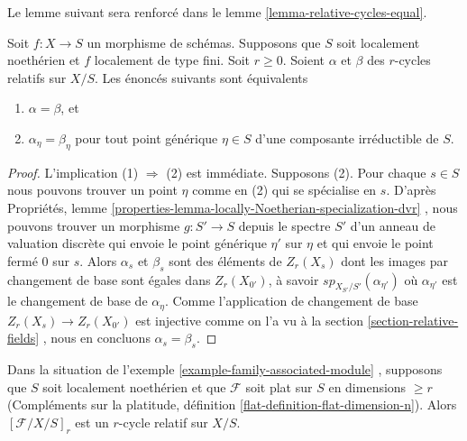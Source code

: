 \noindent
 Le lemme suivant sera renforcé dans le 
lemme  \ref{lemma-relative-cycles-equal}. 

\begin{lemma} 
\label{lemma-uniqueness-extension} 
Soit  $f : X \to S$  un morphisme de schémas. Supposons que  $S$  soit localement noethérien
 et  $f$  localement de type fini. Soit  $r \geq 0$. Soient  $\alpha$  et  $\beta$
  des  $r$-cycles relatifs sur $X/S$. Les énoncés suivants sont équivalents 
\begin{enumerate} 
\item $\alpha = \beta$, et 
\item $\alpha_\eta = \beta_\eta$  pour tout point générique  $\eta \in S$
  d'une composante irréductible de  $S$. 
\end{enumerate} 
\end{lemma} 

\begin{proof}
 L'implication (1)  $\Rightarrow$  (2) est immédiate. 
Supposons (2). Pour chaque $s \in S$  nous pouvons trouver un point $\eta$ comme en (2)
 qui se spécialise en  $s$. 
D'après Propriétés, lemme  \ref{properties-lemma-locally-Noetherian-specialization-dvr} , nous 
pouvons trouver un morphisme  $g : S' \to S$  depuis le
 spectre  $S'$  d'un anneau de valuation discrète qui envoie
 le point générique  $\eta'$  sur  $\eta$  et qui 
envoie le point fermé  $0$  sur  $s$. Alors  $\alpha_s$  et  $\beta_s$
 sont des éléments de  $Z_r(X_s)$  dont les images par changement de base 
sont égales dans  $Z_r(X_{0'})$, à savoir  $sp_{X_{S'}/S'}(\alpha_{\eta'})$
  où  $\alpha_{\eta'}$  est le changement de base de  $\alpha_\eta$. 
Comme l'application de changement de base $Z_r(X_s) \to Z_r(X_{0'})$  est injective 
comme on l'a vu à la section  \ref{section-relative-fields} , nous
 en concluons  $\alpha_s = \beta_s$. 
\end{proof} 

\begin{lemma} 
\label{lemma-family-associated-module-specialization} 
Dans la situation de l'exemple  \ref{example-family-associated-module} , supposons
 que  $S$  soit localement noethérien et que  
$\mathcal{F}$  soit plat sur  $S$  en dimensions $\geq r$
  (Compléments sur la platitude, définition  \ref{flat-definition-flat-dimension-n}). 
Alors  $[\mathcal{F}/X/S]_r$ est un  $r$-cycle relatif sur  $X/S$. 
\end{lemma} 

